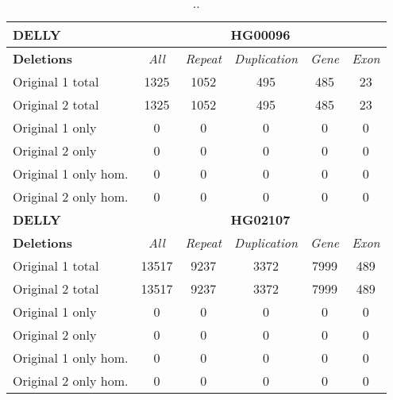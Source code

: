 \begin{table}[htb]
\begin{center}
\begin{tabular}{|l|c||c|c|c|c|}
\hline
{\bf DELLY} & \multicolumn{5}{|c|}{\bf HG00096} \\
\hline
\cline{2-6}
{\bf Deletions} & {\it All} & {\it Repeat} & {\it Duplication} & {\it Gene} & {\it Exon} \\
\hline
Original 1 total & 1325 & 1052 & 495 & 485 & 23\\ 
\hline
Original 2 total & 1325 & 1052 & 495 & 485 & 23\\ 
\hline
Original 1 only & 0 & 0 & 0 & 0 & 0\\ 
\hline
Original 2 only & 0 & 0 & 0 & 0 & 0\\ 
\hline
Original 1 only hom. & 0 & 0 & 0 & 0 & 0\\ 
\hline
Original 2 only hom. & 0 & 0 & 0 & 0 & 0\\ 
\hline
\hline
{\bf DELLY} & \multicolumn{5}{|c|}{\bf HG02107} \\
\hline
\cline{2-6}
{\bf Deletions} & {\it All} & {\it Repeat} & {\it Duplication} & {\it Gene} & {\it Exon} \\
\hline
Original 1 total & 13517 & 9237 & 3372 & 7999 & 489\\ 
\hline
Original 2 total & 13517 & 9237 & 3372 & 7999 & 489\\ 
\hline
Original 1 only & 0 & 0 & 0 & 0 & 0\\ 
\hline
Original 2 only & 0 & 0 & 0 & 0 & 0\\ 
\hline
Original 1 only hom. & 0 & 0 & 0 & 0 & 0\\ 
\hline
Original 2 only hom. & 0 & 0 & 0 & 0 & 0\\ 
\hline
\end{tabular}
\end{center}
\caption{ .. }
\label{tab:orig-vs-orig2-delly-deletions}
\end{table}

